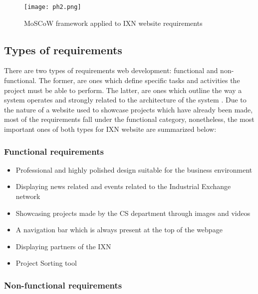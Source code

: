\documentclass[fontsize=10pt]{extarticle}
\numberwithin{figure}{section} %
\providecommand{\tightlist}{%
  \setlength{\itemsep}{0pt}\setlength{\parskip}{0pt}}
\begin{document}
\begin{figure}[H]
      \centering
      \texttt{[image: ph2.png]}
      \caption{MoSCoW framework applied to IXN website requirements}
 \end{figure}

\hypertarget{types-of-requirements-1}{%
\subsection{Types of requirements}\label{types-of-requirements-1}}

There are two types of requirements web development: functional and
non-functional. The former, are ones which define specific tasks and
activities the project must be able to perform. The latter, are ones
which outline the way a system operates and strongly related to the
architecture of the system \cite{g5}. Due to the nature of a website
used to showcase projects which have already been made, most of the
requirements fall under the functional category, nonetheless, the most
important ones of both types for IXN website are summarized below:

\hypertarget{functional-requirements-1}{%
\subsubsection{Functional
requirements}\label{functional-requirements-1}}

\begin{itemize}
\tightlist
\item
  Professional and highly polished design suitable for the business
  environment
\item
  Displaying news related and events related to the Industrial Exchange
  network
\item
  Showcasing projects made by the CS department through images and
  videos
\item
  A navigation bar which is always present at the top of the webpage
\item
  Displaying partners of the IXN
\item
  Project Sorting tool
\end{itemize}

\hypertarget{non-functional-requirements-1}{%
\subsubsection{Non-functional
requirements}\label{non-functional-requirements-1}}
\end{document}
